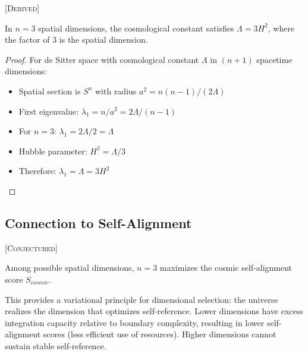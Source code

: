 \begin{corollary} \label{cor:coefficient}
\textsc{[Derived]}

In $n = 3$ spatial dimensions, the cosmological constant satisfies $\Lambda = 3H^2$, where the factor of 3 is the spatial dimension.
\end{corollary}

\begin{proof}
For de Sitter space with cosmological constant $\Lambda$ in $(n+1)$ spacetime dimensions:
\begin{itemize}
    \item Spatial section is $S^n$ with radius $a^2 = n(n-1)/(2\Lambda)$
    \item First eigenvalue: $\lambda_1 = n/a^2 = 2\Lambda/(n-1)$
    \item For $n = 3$: $\lambda_1 = 2\Lambda/2 = \Lambda$
    \item Hubble parameter: $H^2 = \Lambda/3$
    \item Therefore: $\lambda_1 = \Lambda = 3H^2$
\end{itemize}
\end{proof}

\subsection{Connection to Self-Alignment}

\begin{proposition}
\textsc{[Conjectured]}

Among possible spatial dimensions, $n = 3$ maximizes the cosmic self-alignment score $S_{cosmic}$.
\end{proposition}

\begin{remark}
This provides a variational principle for dimensional selection: the universe realizes the dimension that optimizes self-reference. Lower dimensions have excess integration capacity relative to boundary complexity, resulting in lower self-alignment scores (less efficient use of resources). Higher dimensions cannot sustain stable self-reference.
\end{remark}
